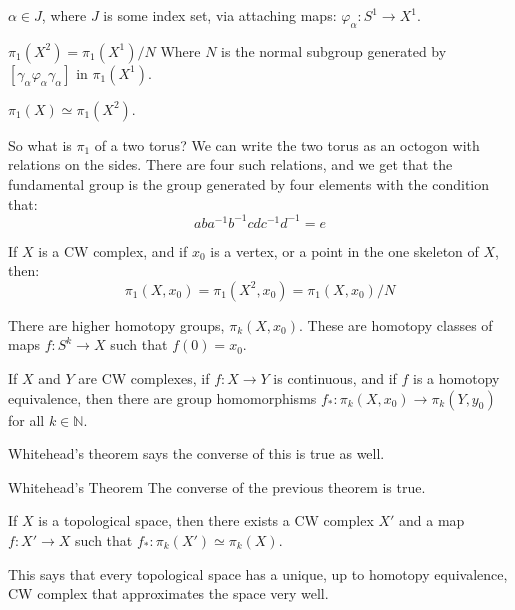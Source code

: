\documentclass{book}                                                           %
\begin{document}
                $\alpha\in{J}$, where $J$ is some index set, via
                attaching maps:
                $\varphi_{\alpha}:S^{1}\rightarrow{X}^{1}$.
                \begin{theorem}
                    $\pi_{1}(X^{2})=\pi_{1}(X^{1})/N$
                    Where $N$ is the normal subgroup generated by
                    $[\gamma_{\alpha}\varphi_{\alpha}\gamma_{\alpha}]$
                    in $\pi_{1}(X^{1})$.
                \end{theorem}
                \begin{theorem}
                    $\pi_{1}(X)\simeq\pi_{1}(X^{2})$.
                \end{theorem}
                So what is $\pi_{1}$ of a two torus? We can write
                the two torus as an octogon with relations on the
                sides. There are four such relations, and we get
                that the fundamental group is the group generated by
                four elements with the condition that:
                \begin{equation}
                    aba^{\minus{1}}b^{\minus{1}}
                    cdc^{\minus{1}}d^{\minus{1}}=e
                \end{equation}
                \begin{theorem}
                    If $X$ is a CW complex, and if
                    $x_{0}$ is a vertex, or a point in the one skeleton
                    of $X$, then:
                    \begin{equation}
                        \pi_{1}(X,x_{0})=\pi_{1}(X^{2},x_{0})
                        =\pi_{1}(X,x_{0})/N
                    \end{equation}
                \end{theorem}
                There are higher homotopy groups, $\pi_{k}(X,x_{0})$.
                These are homotopy classes of maps
                $f:S^{k}\rightarrow{X}$ such that $f(0)=x_{0}$.
                \begin{theorem}
                    If $X$ and $Y$ are CW complexes, if
                    $f:X\rightarrow{Y}$ is continuous, and if $f$ is
                    a homotopy equivalence, then there are group
                    homomorphisms
                    $f_{*}:\pi_{k}(X,x_{0})\rightarrow{\pi}_{k}(Y,y_{0})$
                    for all $k\in\mathbb{N}$.
                \end{theorem}
                Whitehead's theorem says the converse of this is true
                as well.
                \begin{ltheorem}{Whitehead's Theorem}
                    The converse of the previous theorem is true.
                \end{ltheorem}
                \begin{theorem}
                    If $X$ is a topological space, then there exists
                    a CW complex $X'$ and a map
                    $f:X'\rightarrow{X}$ such that
                    $f_{*}:\pi_{k}(X')\simeq\pi_{k}(X)$.
                \end{theorem}
                This says that every topological space has a unique,
                up to homotopy equivalence, CW complex that approximates
                the space very well.
\end{document}
